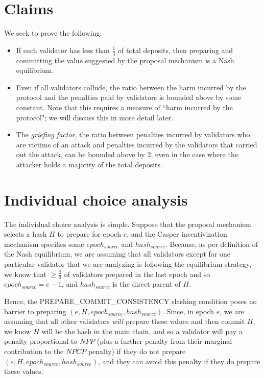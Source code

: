 \documentclass[12pt]{article}
\begin{document}
\section{Claims}

We seek to prove the following:

\begin{itemize}
\item If each validator has less than $\frac{1}{3}$ of total deposits, then preparing and committing the value suggested by the proposal mechanism is a Nash equilibrium.
\item Even if all validators collude, the ratio between the harm incurred by the protocol and the penalties paid by validators is bounded above by some constant. Note that this requires a measure of ``harm incurred by the protocol"; we will discuss this in more detail later.
\item The \textit{griefing factor}, the ratio between penalties incurred by validators who are victims of an attack and penalties incurred by the validators that carried out the attack, can be bounded above by 2, even in the case where the attacker holds a majority of the total deposits.
\end{itemize}

\section{Individual choice analysis}

The individual choice analysis is simple. Suppose that the proposal mechanism selects a hash $H$ to prepare for epoch $e$, and the Casper incentivization mechanism specifies some $epoch_{source}$ and $hash_{source}$. Because, as per definition of the Nash equilibrium, we are assuming that all validators except for one particular validator that we are analyzing is following the equilibrium strategy, we know that $\ge \frac{2}{3}$ of validators prepared in the last epoch and so $epoch_{source} = e - 1$, and $hash_{source}$ is the direct parent of $H$.

Hence, the PREPARE\_COMMIT\_CONSISTENCY slashing condition poses no barrier to preparing $(e, H, epoch_{source}, hash_{source})$. Since, in epoch $e$, we are assuming that all other validators \textit{will} prepare these values and then commit $H$, we know $H$ will be the hash in the main chain, and so a validator will pay a penalty proportional to $NPP$ (plus a further penalty from their marginal contribution to the $NPCP$ penalty) if they do not prepare $(e, H, epoch_{source}, hash_{source})$, and they can avoid this penalty if they do prepare these values.
\end{document}

